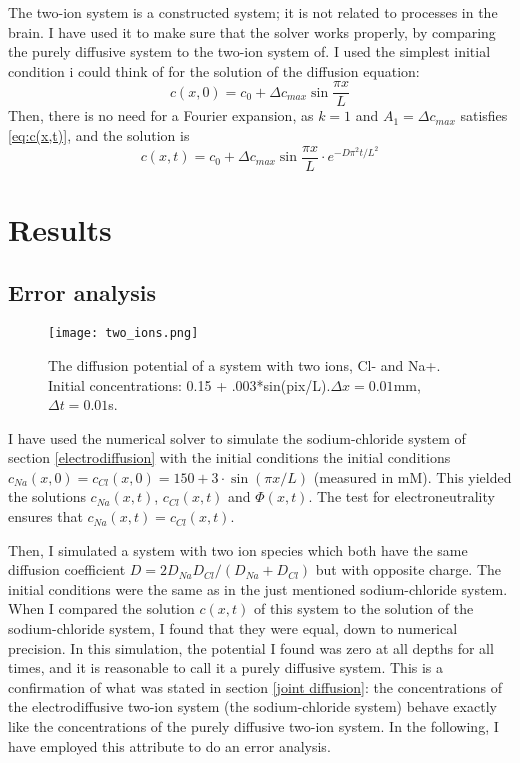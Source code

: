 \documentclass{article}
\begin{document}
The two-ion system is a constructed system; it is not related to processes in the brain. I have used it to make sure that the solver works properly, by comparing the purely diffusive system to the two-ion system of. I used the simplest initial condition i could think of for the solution of the diffusion equation: 
$$c(x,0) =c_0 +  \Delta c_{max}\sin{\frac{\pi x}{L}}$$
Then, there is no need for a Fourier expansion, as $k=1$ and $A_1 = \Delta c_{max}$ satisfies \ref{eq:c(x,t)}, and the solution is
\begin{equation*}
c(x,t) =c_0 + \Delta c_{max} \sin \frac{ \pi x}{L}\cdot e^{-D\pi^2 t /L^2}
\end{equation*}



\section{Results}
\subsection{Error analysis}\label{numerical vs analytical}

\begin{figure}
  \texttt{[image: two\_ions.png]}
  \caption{The diffusion potential of a system with two ions, Cl- and Na+. Initial concentrations: 0.15 + .003*sin(pix/L).$\Delta x = 0.01$mm, $\Delta t = 0.01 $s. }
  \label{fig:two_ions}
\end{figure}

I have used the numerical solver to simulate the sodium-chloride system of section \ref{electrodiffusion} with  the initial conditions the initial conditions $c_{Na}(x,0)=c_{Cl}(x,0)=150+3\cdot \sin(\pi x/L)$ (measured in mM). This yielded the solutions $c_{Na}(x,t)$, $c_{Cl}(x,t)$ and $\Phi (x,t)$. The test for electroneutrality ensures that $c_{Na}(x,t)=c_{Cl}(x,t)$.

Then, I simulated a system with two ion species which both have the same diffusion coefficient $D=2D_{Na}D_{Cl}/(D_{Na}+D_{Cl})$ but with opposite charge. The initial conditions were the same as in the just mentioned sodium-chloride system. When I compared the solution $c(x,t)$ of this system to the solution of the sodium-chloride system, I found that they were equal, down to numerical precision. In this simulation, the potential I found was zero at all depths for all times, and it is reasonable to call it a purely diffusive system. This is a confirmation of what was stated in section \ref{joint diffusion}: the concentrations of the electrodiffusive two-ion system (the sodium-chloride system) behave exactly like the concentrations of the purely diffusive two-ion system. In the following, I have employed this attribute to do an error analysis. 
\end{document}
